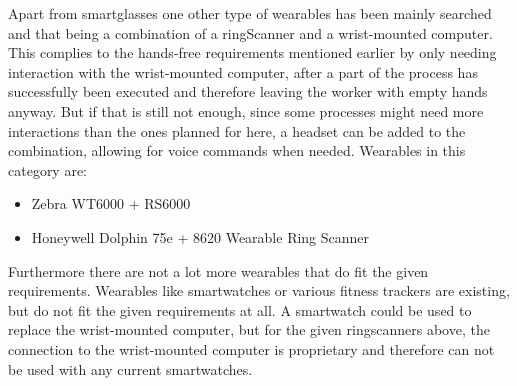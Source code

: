 Apart from smartglasses one other type of wearables has been mainly searched and that being a combination of a \gls{ringScanner} and a wrist-mounted computer. This complies to the hands-free requirements mentioned earlier by only needing interaction with the wrist-mounted computer, after a part of the process has successfully been executed and therefore leaving the worker with empty hands anyway. But if that is still not enough, since some processes might need more interactions than the ones planned for here, a headset can be added to the combination, allowing for voice commands when needed. Wearables in this category are:

\begin{itemize}
	\item Zebra WT6000 + RS6000
	\item Honeywell Dolphin 75e + 8620 Wearable Ring Scanner
\end{itemize}

Furthermore there are not a lot more wearables that do fit the given requirements. Wearables like smartwatches or various fitness trackers are existing, but do not fit the given requirements at all. A smartwatch could be used to replace the wrist-mounted computer, but for the given ringscanners above, the connection to the wrist-mounted computer is proprietary and therefore can not be used with any current smartwatches.